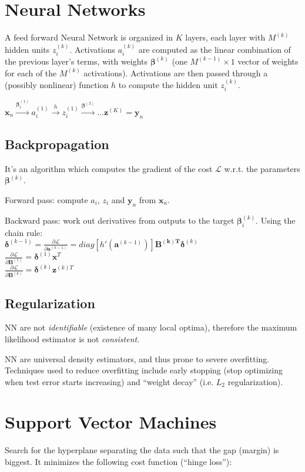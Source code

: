 \documentclass[10pt,a4paper,landscape]{article}
\renewcommand{\bf}[1]{\ensuremath{\mathbf{#1}}}
\newcommand{\bbeta}{\boldsymbol\beta}
\newcommand{\bdelta}{\boldsymbol\delta}
\begin{document}
\begin{multicols*}{4}
\section{Neural Networks}
A feed forward Neural Network is organized in $K$ layers, each layer with $M^{(k)}$ hidden units $z_i^{(k)}$. Activations $a_i^{(k)}$ are computed as the linear combination of the previous layer's terms, with weights $\bbeta^{(k)}$ (one $M^{(k-1)} \times 1$ vector of weights for each of the $M^{(k)}$ activations). Activations are then passed through a (possibly nonlinear) function $h$ to compute the hidden unit $z_i^{(k)}$.

$\bf{x}_n \xrightarrow{\bbeta_i^{(1)}} a_i^{(1)} \xrightarrow{h} z_i^{(1)} \xrightarrow{\bbeta^{(2)}} \dots \bf{z}^{(K)} = \bf{y}_n$

\subsection{Backpropagation}
It's an algorithm which computes the gradient of the cost $\mathcal{L}$ w.r.t. the parameters $\bbeta^{(k)}$.

Forward pass: compute $a_i$, $z_i$ and $\bf{y}_n$ from $\bf{x}_n$.

Backward pass: work out derivatives from outputs to the target $\bbeta_i^{(k)}$. Using the chain rule:\\
$\bdelta^{(k-1)} = \frac{\partial \mathcal{L}}{\partial \bf{a}^{(k-1)}} = diag[ h'(\bf{a}^{(k-1)}) ] \bf{B^{(k)T}} \bdelta^{(k)}$\\
$\frac{\partial \mathcal{L}}{\partial \bf{B}^{(1)}} = \bdelta^{(1)} \bf{x}^T$\\
$\frac{\partial \mathcal{L}}{\partial \bf{B}^{(k)}} = \bdelta^{(k)} \bf{z}^{(k)T}$

\subsection{Regularization}
NN are not \textit{identifiable} (existence of many local optima), therefore the maximum likelihood estimator is not \textit{consistent}.

NN are universal density estimators, and thus prone to severe overfitting. Techniques used to reduce overfitting include early stopping (stop optimizing when test error starts increasing) and ``weight decay'' (i.e. $L_2$ regularization).

\section{Support Vector Machines}
Search for the hyperplane separating the data such that the gap (margin) is biggest.
It minimizes the following cost function (``hinge loss''):


\end{multicols*}
\end{document}

